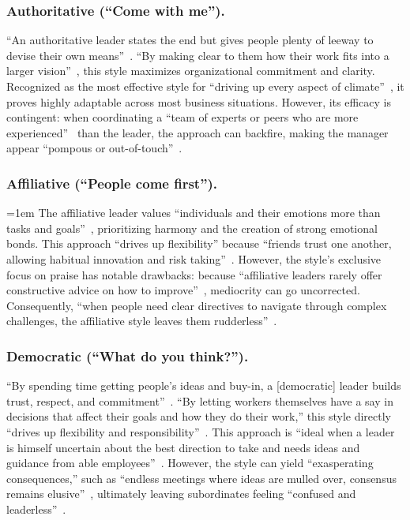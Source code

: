 \subsubsection{Authoritative (``Come with me'').} 
``An authoritative leader states the end but gives people plenty of leeway to devise their own means''~\cite[p.84]{goleman2000leadership}. 
``By making clear to them how their work fits into a larger vision''~\cite[p.83]{goleman2000leadership}, this style maximizes organizational commitment and clarity. 
Recognized as the most effective style for ``driving up every aspect of climate''~\cite[p.83]{goleman2000leadership}, it proves highly adaptable across most business situations. 
However, its efficacy is contingent: when coordinating a ``team of experts or peers who are more experienced''~\cite[p.84]{goleman2000leadership} than the leader, the approach can backfire, making the manager appear ``pompous or out-of-touch''~\cite[p.84]{goleman2000leadership}.

\subsubsection{Affiliative (``People come first'').}
{
\emergencystretch=1em
The affiliative leader values ``individuals and their emotions more than tasks and goals''~\cite[p.~84]{goleman2000leadership}, prioritizing harmony and the creation of strong emotional bonds.
This approach ``drives up flexibility'' because ``friends trust one another, allowing habitual innovation and risk taking''~\cite[p.~84]{goleman2000leadership}.
However, the style's exclusive focus on praise has notable drawbacks: because ``affiliative leaders rarely offer constructive advice on how to improve''~\cite[p.~85]{goleman2000leadership}, mediocrity can go uncorrected.
Consequently, ``when people need clear directives to navigate through complex challenges, the affiliative style leaves them rudderless''~\cite[p.~85]{goleman2000leadership}.
\par}

\subsubsection{Democratic (``What do you think?'').} 
``By spending time getting people's ideas and buy-in, a [democratic] leader builds trust, respect, and commitment''~\cite[p.~85]{goleman2000leadership}. 
``By letting workers themselves have a say in decisions that affect their goals and how they do their work,'' this style directly ``drives up flexibility and responsibility''~\cite[p.~85]{goleman2000leadership}. 
This approach is ``ideal when a leader is himself uncertain about the best direction to take and needs ideas and guidance from able employees''~\cite[p.~85]{goleman2000leadership}. 
However, the style can yield ``exasperating consequences,'' such as ``endless meetings where ideas are mulled over, consensus remains elusive''~\cite[p.~85]{goleman2000leadership}, ultimately leaving subordinates feeling ``confused and leaderless''~\cite[p.~85]{goleman2000leadership}.

